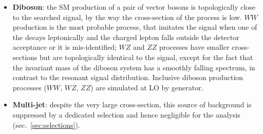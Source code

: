 \begin{itemize}
  \item {\bf Diboson}: the SM production of a pair of vector bosons is topologically close to the searched signal, by the way the cross-section of the process is low. $WW$ production is the most probable process, that imitates the signal when one of the \W decays leptonically and the charged lepton falls outside the detector acceptance or it is mis-identified; $WZ$ and $ZZ$ processes have smaller cross-sections but are topologically identical to the signal, except for the fact that the invariant mass of the diboson system has a smoothly falling spectrum, in contrast to the resonant signal distribution. Inclusive diboson production processes ($WW$, $WZ$, $ZZ$) are simulated at LO by \PYTHIA generator.
  \item {\bf Multi-jet}: despite the very large cross-section, this source of background is suppressed by a dedicated selection and hence negligible for the analysis (sec.~\ref{sec:selections}).
\end{itemize}




